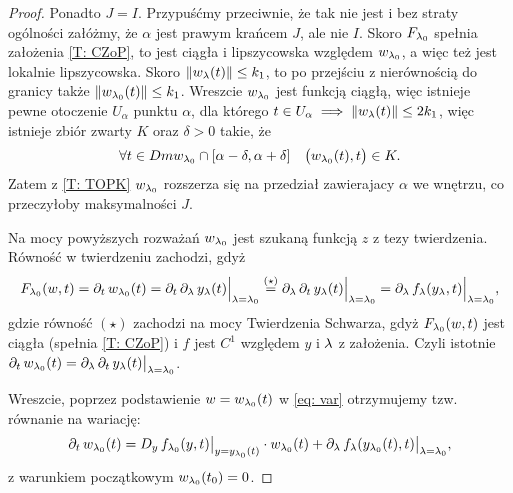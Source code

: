 \begin{proof}
  Ponadto $ J = I $. Przypuśćmy przeciwnie, że tak nie jest i bez straty ogólności załóżmy, że $\alpha$ jest prawym
  krańcem $J$, ale nie $I$. Skoro $F_{\l_0}$ spełnia założenia \ref{T: CZoP}, to jest ciągła i lipszycowska względem $w_{\l_0}$, a więc też jest lokalnie lipszycowska. Skoro $\norm{ w_\l(t) } \le k_1$, to po przejściu z nierównością do granicy także $\norm{ w_{\l_0}(t) } \le k_1$. Wreszcie $w_{\l_0}$ jest funkcją ciągłą, więc istnieje pewne otoczenie $U_\alpha$ punktu $\alpha$, dla
  którego $ t \in U_\alpha \implies \norm{ w_\l(t) } \le 2k_1$, więc istnieje zbiór zwarty $K$ oraz $\delta > 0$ takie, że 
%
  \begin{equation*}
    \forall t\in Dm w_{\l_0} \cap [\alpha - \delta, \alpha + \delta] \quad \big( w_{\l_0}(t), t \big) \in K.
  \end{equation*}
%
  Zatem z \ref{T: TOPK} $w_{\l_0}$ rozszerza się na przedział zawierajacy $\alpha$ we wnętrzu, co przeczyłoby maksymalności $J$.
  
  Na mocy powyższych rozważań $w_{\l_0}$ jest szukaną funkcją $z$ z tezy twierdzenia. Równość w twierdzeniu zachodzi, gdyż
%  
  \begin{align*}
  	F_{\l_0}(w, t) = \pd{t} w_{\l_0}(t) = \pd{t} \pd{\l} y_\l(t) \Big\vert_{ \l = \l_0 } \overset{(\star)}{ = } 
  	\pd{\l} \pd{t} y_\l(t) \Big\vert_{ \l = \l_0 } = \pd{\l} f_\l(y_\l, t) \Big\vert_{ \l = \l_0 },
  \end{align*} 
%
  gdzie równość $(\star)$ zachodzi na mocy Twierdzenia Schwarza, gdyż $F_{\l_0}(w, t)$ jest ciągła (spełnia \ref{T: CZoP}) i
  $f$ jest $C^1$ względem $y$ i $\l$ z założenia. Czyli istotnie $\pd{t} w_{\l_0}(t) = \pd{\l } \pd{t} y_\l (t) \big\vert_{ \l = \l_0 }$.
  
  Wreszcie, poprzez podstawienie $w = w_{\l_0}(t)$ w \eqref{eq: var} otrzymujemy tzw. równanie na wariację:
%
  \begin{equation*}
  	\pd{t} w_{\l_0}(t) =  D_y \, f_{\l_0} (y, t) \big\vert_{ y = y_{\l_0}(t) } \cdot w_{\l_0}(t) + \pd{ \l } f_{\l}( y_{\l_0}(t), t) 
  	\big\vert_{ \l = \l_0 },
  \end{equation*} 
%
  z warunkiem początkowym $w_{\l_0}(t_0) = 0$. \qedhere
\end{proof}

%

